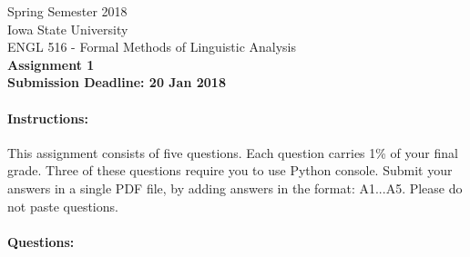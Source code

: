 \documentclass[11pt,a4paper]{article}
\begin{document}
\begin{center}
  Spring Semester 2018 \\ Iowa State University\\[3ex]
  {\large ENGL 516 - Formal Methods of Linguistic Analysis}\\[3ex]
  \textbf{Assignment 1} \\ \textbf{Submission Deadline: 20 Jan 2018}
\end{center}


\paragraph{Instructions:} This assignment consists of five questions. Each question carries 1\% of your final grade. Three of these questions require you to use Python console. Submit your answers in a single PDF file, by adding answers in the format: A1...A5. Please do not paste questions. 

\paragraph{Questions:}
\end{document}

